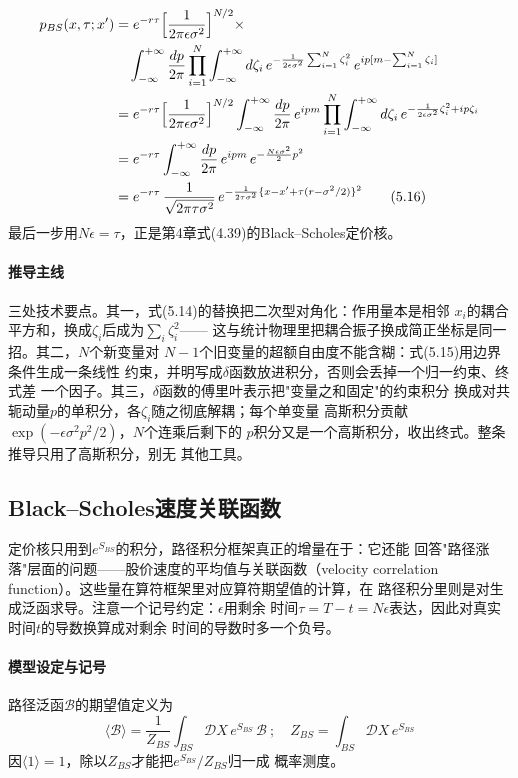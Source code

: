 \begin{align*}
p_{BS}(x,\tau;x')&=e^{-r\tau}\Bigl[\frac{1}{2\pi\epsilon\sigma^{2}}\Bigr]^{N/2}\times\\
&\quad\int_{-\infty}^{+\infty}\frac{dp}{2\pi}\prod_{i=1}^{N}\int_{-\infty}^{+\infty}
d\zeta_{i}\,e^{-\frac{1}{2\epsilon\sigma^{2}}\sum_{i=1}^{N}\zeta_{i}^{2}}\,
e^{ip[m-\sum_{i=1}^{N}\zeta_{i}]}\\
&=e^{-r\tau}\Bigl[\frac{1}{2\pi\epsilon\sigma^{2}}\Bigr]^{N/2}
\int_{-\infty}^{+\infty}\frac{dp}{2\pi}\,e^{ipm}
\prod_{i=1}^{N}\int_{-\infty}^{+\infty}d\zeta_{i}\,
e^{-\frac{1}{2\epsilon\sigma^{2}}\zeta_{i}^{2}+ip\zeta_{i}}\\
&=e^{-r\tau}\int_{-\infty}^{+\infty}\frac{dp}{2\pi}\,
e^{ipm}\,e^{-\frac{N\epsilon\sigma^{2}}{2}p^{2}}\\
&=e^{-r\tau}\,\frac{1}{\sqrt{2\pi\tau\sigma^{2}}}\,
e^{-\frac{1}{2\tau\sigma^{2}}\{x-x'+\tau(r-\sigma^{2}/2)\}^{2}}
\tag{5.16}
\end{align*}
最后一步用$N\epsilon=\tau$，正是第4章式(4.39)的Black--Scholes定价核。

\paragraph{推导主线}
三处技术要点。其一，式(5.14)的替换把二次型对角化：作用量本是相邻
$x_{i}$的耦合平方和，换成$\zeta_{i}$后成为$\sum_{i}\zeta_{i}^{2}$——
这与统计物理里把耦合振子换成简正坐标是同一招。其二，$N$个新变量对
$N-1$个旧变量的超额自由度不能含糊：式(5.15)用边界条件生成一条线性
约束，并明写成$\delta$函数放进积分，否则会丢掉一个归一约束、终式差
一个因子。其三，$\delta$函数的傅里叶表示把"变量之和固定"的约束积分
换成对共轭动量$p$的单积分，各$\zeta_{i}$随之彻底解耦；每个单变量
高斯积分贡献$\exp(-\epsilon\sigma^{2}p^{2}/2)$，$N$个连乘后剩下的
$p$积分又是一个高斯积分，收出终式。整条推导只用了高斯积分，别无
其他工具。

\subsection*{Black--Scholes速度关联函数}

定价核只用到$e^{S_{BS}}$的积分，路径积分框架真正的增量在于：它还能
回答"路径涨落"层面的问题——股价速度的平均值与关联函数（velocity
correlation function）。这些量在算符框架里对应算符期望值的计算，在
路径积分里则是对生成泛函求导。注意一个记号约定：$\epsilon$用剩余
时间$\tau=T-t=N\epsilon$表达，因此对真实时间$t$的导数换算成对剩余
时间的导数时多一个负号。

\paragraph{模型设定与记号}
路径泛函$\mathcal{B}$的期望值定义为
\begin{equation*}
\langle\mathcal{B}\rangle=\frac{1}{Z_{BS}}\int_{BS}\mathcal{D}X\,
e^{S_{BS}}\,\mathcal{B}\ ;\quad
Z_{BS}=\int_{BS}\mathcal{D}X\,e^{S_{BS}}
\tag{5.17}
\end{equation*}
因$\langle 1\rangle=1$，除以$Z_{BS}$才能把$e^{S_{BS}}/Z_{BS}$归一成
概率测度。

